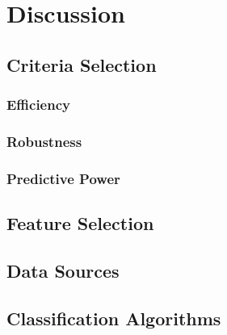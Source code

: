 \documentclass[../thesis/thesis.tex]{subfiles}
\begin{document}
\chapter{Discussion}
\label{chap:discussion}

\section{Criteria Selection}

\subsection{Efficiency}

\subsection{Robustness}

\subsection{Predictive Power}

\section{Feature Selection}

\section{Data Sources}

\section{Classification Algorithms}

\end{document}
